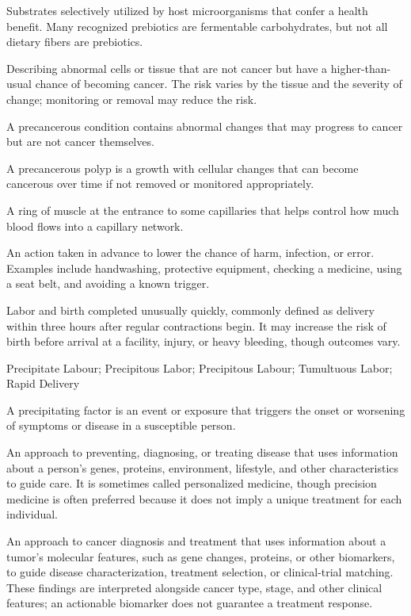  Substrates selectively utilized by host microorganisms that confer a health benefit. Many recognized prebiotics are fermentable carbohydrates, but not all dietary fibers are prebiotics.

 Describing abnormal cells or tissue that are not cancer but have a higher-than-usual chance of becoming cancer. The risk varies by the tissue and the severity of change; monitoring or removal may reduce the risk.

 A precancerous condition contains abnormal changes that may progress to cancer but are not cancer themselves.

 A precancerous polyp is a growth with cellular changes that can become cancerous over time if not removed or monitored appropriately.

 A ring of muscle at the entrance to some capillaries that helps control how much blood flows into a capillary network.

 An action taken in advance to lower the chance of harm, infection, or error. Examples include handwashing, protective equipment, checking a medicine, using a seat belt, and avoiding a known trigger.

 Labor and birth completed unusually quickly, commonly defined as delivery within three hours after regular contractions begin. It may increase the risk of birth before arrival at a facility, injury, or heavy bleeding, though outcomes vary.

\synonyms
Precipitate Labour; Precipitous Labor; Precipitous Labour; Tumultuous Labor; Rapid Delivery

 A precipitating factor is an event or exposure that triggers the onset or worsening of symptoms or disease in a susceptible person.

 An approach to preventing, diagnosing, or treating disease that uses information about a person’s genes, proteins, environment, lifestyle, and other characteristics to guide care. It is sometimes called personalized medicine, though precision medicine is often preferred because it does not imply a unique treatment for each individual.


 An approach to cancer diagnosis and treatment that uses information about a tumor’s molecular features, such as gene changes, proteins, or other biomarkers, to guide disease characterization, treatment selection, or clinical-trial matching. These findings are interpreted alongside cancer type, stage, and other clinical features; an actionable biomarker does not guarantee a treatment response.

